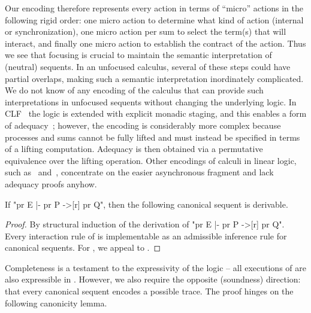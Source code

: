 \documentclass{article}
\begin{document}
Our encoding therefore represents every \spi action in terms of ``micro''
actions in the following rigid order: one micro action to determine what kind of
action (internal or synchronization), one micro action per sum to select the
term(s) that will interact, and finally one micro action to establish the
contract of the action. Thus we see that focusing is crucial to maintain the
semantic interpretation of (neutral) sequents. In an unfocused calculus, several
of these steps could have partial overlaps, making such a semantic
interpretation inordinately complicated. We do not know of any encoding of the
 calculus that can provide such interpretations in unfocused sequents
without changing the underlying logic. In CLF~\cite{cervesato03tr} the logic is
extended with explicit monadic staging, and this enables a form of
adequacy~\cite{cervesato03tr}; however, the encoding is considerably more
complex because processes and sums cannot be fully lifted and must instead be
specified in terms of a lifting computation. Adequacy is then obtained via a
permutative equivalence over the lifting operation. Other encodings of 
calculi in linear logic, such as~\cite{garg05concur} and~\cite{baelde05stage},
concentrate on the easier asynchronous fragment and lack adequacy proofs anyhow.

\def\sproc{\set{proc}}
\def\ssum{\set{sum}}
\def\sinter{\set{inter}}

\begin{thm}[completeness] \label{thm:completeness} If "pr E |- pr P ->[r] pr Q", then the following canonical sequent is derivable.
  
\end{thm}

\begin{proof}
  By structural induction of the derivation of "pr E |- pr P ->[r] pr Q". Every
  interaction rule of \spi is implementable as an admissible inference rule for
  canonical sequents. For , we appeal to .
\end{proof}

Completeness is a testament to the expressivity of the logic -- all executions
of \spi are also expressible in \hyll. However, we also require the opposite
(soundness) direction: that every canonical sequent encodes a possible \spi
trace. The proof hinges on the following canonicity lemma.
\end{document}
